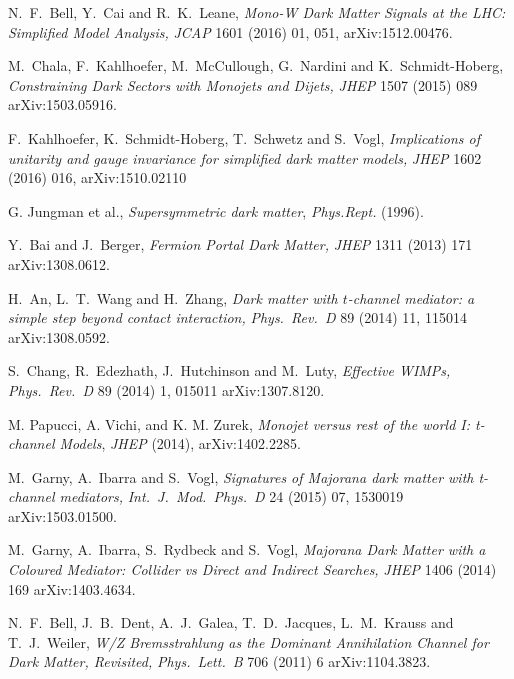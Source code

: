  N.~F.~Bell, Y.~Cai and R.~K.~Leane,
  \emph{Mono-W Dark Matter Signals at the LHC: Simplified Model Analysis,}
  \emph{JCAP}  1601 (2016) 01,  051, arXiv:1512.00476.

 M.~Chala, F.~Kahlhoefer, M.~McCullough, G.~Nardini and K.~Schmidt-Hoberg,
\emph{Constraining Dark Sectors with Monojets and Dijets,}
  \emph{JHEP} 1507 (2015) 089
  arXiv:1503.05916. %

 F.~Kahlhoefer, K.~Schmidt-Hoberg, T.~Schwetz and S.~Vogl,
\emph{Implications of unitarity and gauge invariance for simplified dark matter models,}
  \emph{JHEP}  1602 (2016) 016, arXiv:1510.02110

 G. Jungman et al., \emph{Supersymmetric dark matter}, \emph{Phys.Rept.} (1996).

 Y.~Bai and J.~Berger,
  \emph{Fermion Portal Dark Matter,}
  \emph{JHEP} 1311 (2013) 171
  arXiv:1308.0612. %

 H.~An, L.~T.~Wang and H.~Zhang,
  \emph{Dark matter with $t$-channel mediator: a simple step beyond contact interaction,}
  \emph{Phys.\ Rev.\ D} 89 (2014) 11,  115014
  arXiv:1308.0592. %

 S.~Chang, R.~Edezhath, J.~Hutchinson and M.~Luty,
  \emph{Effective WIMPs,}
  \emph{Phys.\ Rev.\ D} 89 (2014) 1,  015011
  arXiv:1307.8120. %

 M. Papucci, A. Vichi, and K. M. Zurek, \emph{Monojet versus rest of the world I: t-channel Models}, \emph{JHEP} (2014), arXiv:1402.2285.

 M.~Garny, A.~Ibarra and S.~Vogl,
  \emph{Signatures of Majorana dark matter with t-channel mediators,}
  \emph{Int.\ J.\ Mod.\ Phys.\ D} 24 (2015) 07,  1530019
  arXiv:1503.01500. %

 M.~Garny, A.~Ibarra, S.~Rydbeck and S.~Vogl,
  \emph{Majorana Dark Matter with a Coloured Mediator: Collider vs Direct and Indirect Searches,}
  \emph{JHEP} 1406 (2014) 169
  arXiv:1403.4634. %

 N.~F.~Bell, J.~B.~Dent, A.~J.~Galea, T.~D.~Jacques, L.~M.~Krauss and T.~J.~Weiler,
  \emph{W/Z Bremsstrahlung as the Dominant Annihilation Channel for Dark Matter, Revisited,}
  \emph{Phys.\ Lett.\ B} 706 (2011) 6
  arXiv:1104.3823. %

